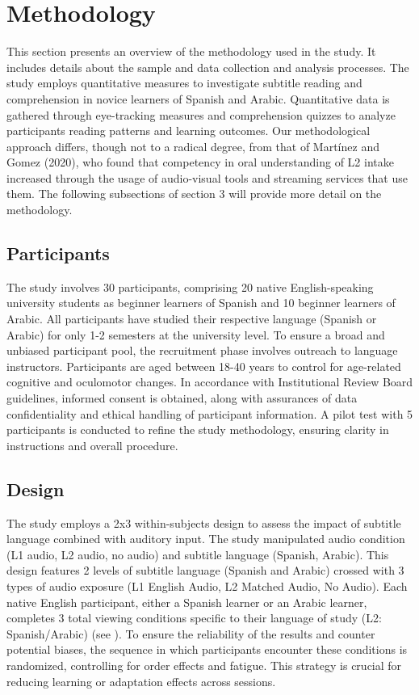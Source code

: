 \section{Methodology}\label{sec-methodology}

This section presents an overview of the methodology used in the study.
It includes details about the sample and data collection and analysis
processes. The study employs quantitative measures to investigate
subtitle reading and comprehension in novice learners of Spanish and
Arabic. Quantitative data is gathered through eye-tracking measures and
comprehension quizzes to analyze participants\textquotesingle{} reading
patterns and learning outcomes. Our methodological approach differs,
though not to a radical degree, from that of Martínez and Gomez (2020),
who found that competency in oral understanding of L2 intake increased
through the usage of audio-visual tools and streaming services that use
them. The following subsections of section 3 will provide more detail on
the methodology.

\subsection{Participants}\label{sub-sec-participants}

The study involves 30 participants, comprising 20 native
English-speaking university students as beginner learners of Spanish and
10 beginner learners of Arabic. All participants have studied their
respective language (Spanish or Arabic) for only 1-2 semesters at the
university level. To ensure a broad and unbiased participant pool, the
recruitment phase involves outreach to language instructors.
Participants are aged between 18-40 years to control for age-related
cognitive and oculomotor changes. In accordance with Institutional
Review Board guidelines, informed consent is obtained, along with
assurances of data confidentiality and ethical handling of participant
information. A pilot test with 5 participants is conducted to refine the
study methodology, ensuring clarity in instructions and overall
procedure.

\subsection{Design}\label{sub-sec-design}

The study employs a 2x3 within-subjects design to assess the impact of
subtitle language combined with auditory input. The study manipulated
audio condition (L1 audio, L2 audio, no audio) and subtitle language
(Spanish, Arabic). This design features 2 levels of subtitle language
(Spanish and Arabic) crossed with 3 types of audio exposure (L1 English
Audio, L2 Matched Audio, No Audio). Each native English participant,
either a Spanish learner or an Arabic learner, completes 3 total viewing
conditions specific to their language of study (L2: Spanish/Arabic) (see
). To ensure the reliability of the results and counter potential
biases, the sequence in which participants encounter these conditions is
randomized, controlling for order effects and fatigue. This strategy is
crucial for reducing learning or adaptation effects across sessions.

